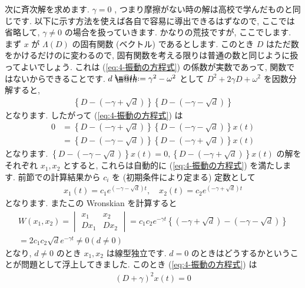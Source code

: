 \documentclass[openany, a4paper, oneside]{book}
\makeatletter
\newcommand*{\defeq}{\mathrel{\rlap{%
\raisebox{0.3ex}{$\m@th\cdot$}}%
\raisebox{-0.3ex}{$\m@th\cdot$}}%
=}
\theoremstyle{break}
\theoremstyle{breakdefn}
\makeatother
\begin{document}
次に斉次解を求めます.
$\gamma = 0$ , つまり摩擦がない時の解は高校で学んだものと同じです.
以下に示す方法を使えば各自で容易に導出できるはずなので,
ここでは省略して,  $\gamma \not= 0$ の場合を扱っていきます.
かなりの荒技ですが, ここでします.
まず $x$ が $\Lambda (D)$ の固有関数 (ベクトル) であるとします.
このとき $D$ はただ数をかけるだけのに変わるので,
固有関数を考える限りは普通の数と同じように扱ってよいでしょう.
これは (\ref{eq:4-振動の方程式}) の係数が実数であって, 関数ではないからできることです.
$d \defeq \gamma ^2 - \omega ^2$ として $D^2 + 2 \gamma D + \omega ^2$ を因数分解すると,
\begin{gather}
\left \{ D - ( - \gamma + \sqrt{d} ) \right \} \left \{ D - ( - \gamma - \sqrt{d} ) \right \}
\end{gather}
となります.
したがって (\ref{eq:4-振動の方程式}) は
\begin{align}
0
&=
\left \{ D - ( - \gamma + \sqrt{d} ) \right \} \left \{ D - ( - \gamma - \sqrt{d} ) \right \} x (t) \\
&=
\left \{ D - ( - \gamma - \sqrt{d} ) \right \} \left \{ D - ( - \gamma + \sqrt{d} ) \right \} x (t)
\end{align}
となります.
$\left \{ D - ( - \gamma - \sqrt{d} ) \right \} x (t)=0,
\left \{ D - ( - \gamma + \sqrt{d} ) \right \} x (t)$
の解をそれぞれ $x_1 , x_2$ とすると, これらは自動的に (\ref{eq:4-振動の方程式}) を満たします.
前節での計算結果から $c_i$ を (初期条件により定まる) 定数として
\begin{gather}
x_1 (t)
=
c_1 e^{ ( - \gamma - \sqrt{d} ) t}
, \quad
x_2 (t)
=
c_2 e^{ ( -\gamma + \sqrt{d} ) t}
\end{gather}
となります.
またこの Wronskian を計算すると
\begin{gather}
W (x_1 ,x_2)
=
\begin{vmatrix}
x_1 & x_2 \\
D x_1 & D x_2
\end{vmatrix}
=
c_1 c_2 e^{- \gamma t} \left \{ ( -\gamma + \sqrt{d} ) - ( - \gamma - \sqrt{d} ) \right \}  \\
=
2 c_1 c_2 \sqrt{d} e^{- \gamma t}
\not=
0 ( d \not= 0)
\end{gather}
となり,  $d \not= 0$ のとき $x_1,x_2$ は線型独立です.
$d=0$ のときはどうするかということが問題として浮上してきました.
このとき (\ref{eq:4-振動の方程式}) は
\begin{gather}
( D + \gamma ) ^2 x (t) =0
\end{gather}
\end{document}
